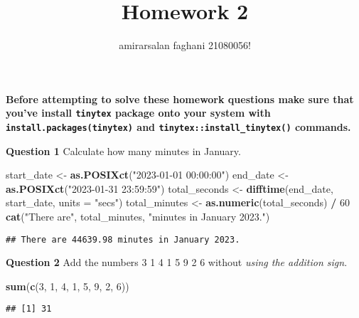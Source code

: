 \documentclass[
]{article}
\title{Homework 2}
\author{amirarsalan faghani 21080056!}
\date{}
\newenvironment{Shaded}{\begin{snugshade}}{\end{snugshade}}
\newcommand{\DataTypeTok}[1]{\textcolor[rgb]{0.13,0.29,0.53}{#1}}
\newcommand{\DecValTok}[1]{\textcolor[rgb]{0.00,0.00,0.81}{#1}}
\newcommand{\KeywordTok}[1]{\textcolor[rgb]{0.13,0.29,0.53}{\textbf{#1}}}
\newcommand{\NormalTok}[1]{#1}
\newcommand{\OperatorTok}[1]{\textcolor[rgb]{0.81,0.36,0.00}{\textbf{#1}}}
\newcommand{\StringTok}[1]{\textcolor[rgb]{0.31,0.60,0.02}{#1}}
\begin{document}
\maketitle

\textbf{Before attempting to solve these homework questions make sure
that you've install \texttt{tinytex} package onto your system with
\texttt{install.packages(tinytex)} and
\texttt{tinytex::install\_tinytex()} commands.}

\vspace{1cm}

\textbf{Question 1} Calculate how many minutes in January.

\begin{Shaded}
\begin{Highlighting}[]
\NormalTok{start_date <-}\StringTok{ }\KeywordTok{as.POSIXct}\NormalTok{(}\StringTok{"2023-01-01 00:00:00"}\NormalTok{)}
\NormalTok{end_date <-}\StringTok{ }\KeywordTok{as.POSIXct}\NormalTok{(}\StringTok{"2023-01-31 23:59:59"}\NormalTok{)}
\NormalTok{total_seconds <-}\StringTok{ }\KeywordTok{difftime}\NormalTok{(end_date, start_date, }\DataTypeTok{units =} \StringTok{"secs"}\NormalTok{)}
\NormalTok{total_minutes <-}\StringTok{ }\KeywordTok{as.numeric}\NormalTok{(total_seconds) }\OperatorTok{/}\StringTok{ }\DecValTok{60}
\KeywordTok{cat}\NormalTok{(}\StringTok{"There are"}\NormalTok{, total_minutes, }\StringTok{"minutes in January 2023."}\NormalTok{)}
\end{Highlighting}
\end{Shaded}

\begin{verbatim}
## There are 44639.98 minutes in January 2023.
\end{verbatim}

\textbf{Question 2} Add the numbers 3 1 4 1 5 9 2 6 without \emph{using
the addition sign}.

\begin{Shaded}
\begin{Highlighting}[]
\KeywordTok{sum}\NormalTok{(}\KeywordTok{c}\NormalTok{(}\DecValTok{3}\NormalTok{, }\DecValTok{1}\NormalTok{, }\DecValTok{4}\NormalTok{, }\DecValTok{1}\NormalTok{, }\DecValTok{5}\NormalTok{, }\DecValTok{9}\NormalTok{, }\DecValTok{2}\NormalTok{, }\DecValTok{6}\NormalTok{))}
\end{Highlighting}
\end{Shaded}

\begin{verbatim}
## [1] 31
\end{verbatim}
\end{document}

